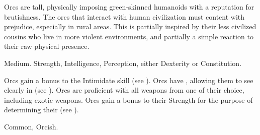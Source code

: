   Orcs are tall, physically imposing green-skinned humanoids with a reputation for brutishness.
  The orcs that interact with human civilization must content with prejudice, especially in rural areas.
  This is partially inspired by their less civilized cousins who live in more violent environments, and partially a simple reaction to their raw physical presence.

   Medium.
    Strength,  Intelligence,  Perception, either  Dexterity or  Constitution.
  \begin{raggeditemize}
     Orcs gain a  bonus to the Intimidate skill (see ).
     Orcs have , allowing them to see clearly in  (see ).
     Orcs are proficient with all weapons from one  of their choice, including exotic weapons.
     Orcs gain a  bonus to their Strength for the purpose of determining their  (see ).
  \end{raggeditemize}
   Common, Orcish.
